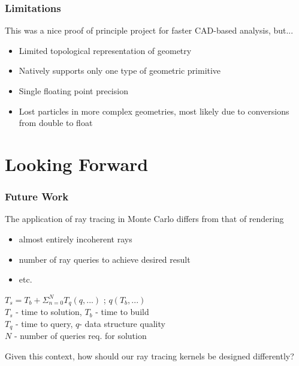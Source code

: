 \documentclass[12pt]{beamer}
\begin{document}
\begin{frame}
\frametitle{Limitations}

This was a nice proof of principle project for faster CAD-based analysis, but... \\
\vfill
\begin{itemize}
\item Limited topological representation of geometry
\item Natively supports only one type of geometric primitive
\item Single floating point precision
\item Lost particles in more complex geometries, most likely due to conversions from double to float
\end{itemize}
\end{frame}

\section{Looking Forward} %

\begin{frame}

\frametitle{Future Work}

The application of ray tracing in Monte Carlo differs from that of rendering
  \begin{itemize}
    \item almost entirely incoherent rays
    \item number of ray queries to achieve desired result
    \item etc.
  \end{itemize}
\begin{center}
$T_s = T_b + \Sigma_{n=0}^{N} T_q(q,...)$ ; $q(T_b,...)$\\
\vfill
\small{
$T_s$ - time to solution, $T_b$ - time to build \\
  $T_q$ - time to query, $q$- data structure quality\\
$N$ - number of queries req. for solution}
\end{center}
Given this context, how should our ray tracing kernels be designed differently?

\end{frame}
\end{document}
